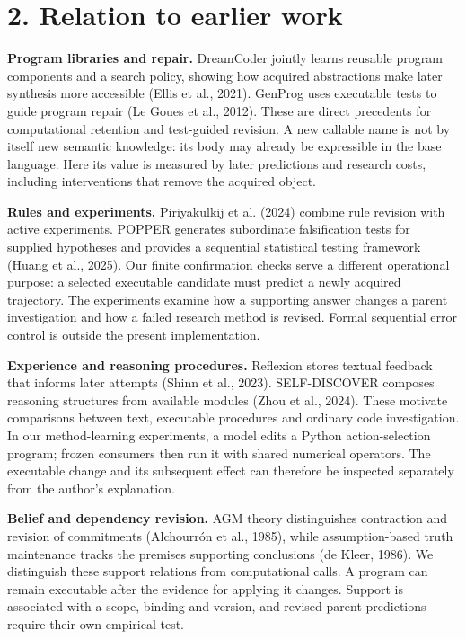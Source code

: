 \documentclass[twoside,11pt]{article}
\begin{document}
\section*{2. Relation to earlier work}

\textbf{Program libraries and repair.} DreamCoder jointly learns reusable program components and a search policy, showing how acquired abstractions make later synthesis more accessible (Ellis et al., 2021). GenProg uses executable tests to guide program repair (Le Goues et al., 2012). These are direct precedents for computational retention and test-guided revision. A new callable name is not by itself new semantic knowledge: its body may already be expressible in the base language. Here its value is measured by later predictions and research costs, including interventions that remove the acquired object.


\textbf{Rules and experiments.} Piriyakulkij et al. (2024) combine rule revision with active experiments. POPPER generates subordinate falsification tests for supplied hypotheses and provides a sequential statistical testing framework (Huang et al., 2025). Our finite confirmation checks serve a different operational purpose: a selected executable candidate must predict a newly acquired trajectory. The experiments examine how a supporting answer changes a parent investigation and how a failed research method is revised. Formal sequential error control is outside the present implementation.


\textbf{Experience and reasoning procedures.} Reflexion stores textual feedback that informs later attempts (Shinn et al., 2023). SELF-DISCOVER composes reasoning structures from available modules (Zhou et al., 2024). These motivate comparisons between text, executable procedures and ordinary code investigation. In our method-learning experiments, a model edits a Python action-selection program; frozen consumers then run it with shared numerical operators. The executable change and its subsequent effect can therefore be inspected separately from the author's explanation.


\textbf{Belief and dependency revision.} AGM theory distinguishes contraction and revision of commitments (Alchourrón et al., 1985), while assumption-based truth maintenance tracks the premises supporting conclusions (de Kleer, 1986). We distinguish these support relations from computational calls. A program can remain executable after the evidence for applying it changes. Support is associated with a scope, binding and version, and revised parent predictions require their own empirical test.
\end{document}
